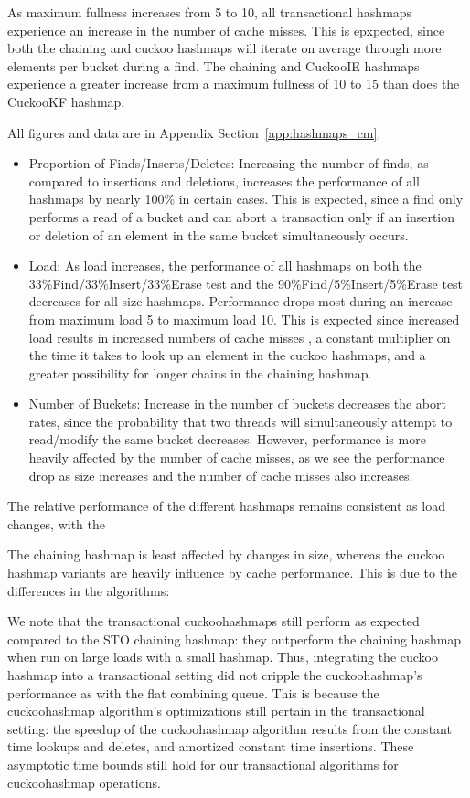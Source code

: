As maximum fullness increases from 5 to 10, all transactional hashmaps experience an increase in the number of cache misses. This is epxpected, since both the chaining and cuckoo hashmaps will iterate on average through more elements per bucket during a find. The chaining and CuckooIE hashmaps experience a greater increase from a maximum fullness of 10 to 15 than does the CuckooKF hashmap.

All figures and data are in Appendix Section~\ref{app:hashmaps_cm}.

\begin{itemize}
    \item Proportion of Finds/Inserts/Deletes: Increasing the number of finds, as compared to insertions and deletions, increases the performance of all hashmaps by nearly 100\% in certain cases. This is expected, since a find only performs a read of a bucket and can abort a transaction only if an insertion or deletion of an element in the same bucket simultaneously occurs.
    \item Load: As load increases, the performance of all hashmaps on both the 33\%Find/33\%Insert/33\%Erase test and the 90\%Find/5\%Insert/5\%Erase test decreases for all size hashmaps. Performance drops most during an increase from maximum load 5 to maximum load 10. This is expected since increased load results in increased numbers of cache misses , a constant multiplier on the time it takes to look up an element in the cuckoo hashmaps, and a greater possibility for longer chains in the chaining hashmap. 
    \item Number of Buckets: Increase in the number of buckets decreases the abort rates, since the probability that two threads will simultaneously attempt to read/modify the same bucket decreases. However, performance is more heavily affected by the number of cache misses, as we see the performance drop as size increases and the number of cache misses also increases. 
\end{itemize}

The relative performance of the different hashmaps remains consistent as load changes, with the 

The chaining hashmap is least affected by changes in size, whereas the cuckoo hashmap variants are heavily influence by cache performance. This is due to the differences in the algorithms: 

We note that the transactional cuckoohashmaps still perform as expected compared to the STO chaining hashmap: they outperform the chaining hashmap when run on large loads with a small hashmap. Thus, integrating the cuckoo hashmap into a transactional setting did not cripple the cuckoohashmap's performance as with the flat combining queue. This is because the cuckoohashmap algorithm's optimizations still pertain in the transactional setting: the speedup of the cuckoohashmap algorithm results from the constant time lookups and deletes, and amortized constant time insertions. These asymptotic time bounds still hold for our transactional algorithms for cuckoohashmap operations.

